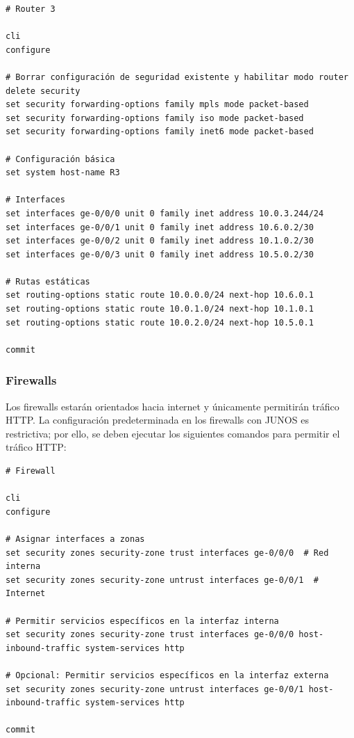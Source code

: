 \documentclass[%
    school=etsisi,%
    degree=61TI,%
]{upm-report}
\begin{document}
\begin{lstlisting}[breaklines]
# Router 3

cli
configure

# Borrar configuración de seguridad existente y habilitar modo router
delete security
set security forwarding-options family mpls mode packet-based
set security forwarding-options family iso mode packet-based
set security forwarding-options family inet6 mode packet-based

# Configuración básica
set system host-name R3

# Interfaces
set interfaces ge-0/0/0 unit 0 family inet address 10.0.3.244/24
set interfaces ge-0/0/1 unit 0 family inet address 10.6.0.2/30
set interfaces ge-0/0/2 unit 0 family inet address 10.1.0.2/30
set interfaces ge-0/0/3 unit 0 family inet address 10.5.0.2/30

# Rutas estáticas
set routing-options static route 10.0.0.0/24 next-hop 10.6.0.1
set routing-options static route 10.0.1.0/24 next-hop 10.1.0.1
set routing-options static route 10.0.2.0/24 next-hop 10.5.0.1

commit
\end{lstlisting}

\subsubsection{Firewalls}

Los firewalls estarán orientados hacia internet y únicamente permitirán tráfico HTTP. La configuración predeterminada en los firewalls con JUNOS es restrictiva; por ello, se deben ejecutar los siguientes comandos para permitir el tráfico HTTP:

\begin{lstlisting}[breaklines]
# Firewall

cli
configure

# Asignar interfaces a zonas
set security zones security-zone trust interfaces ge-0/0/0  # Red interna
set security zones security-zone untrust interfaces ge-0/0/1  # Internet

# Permitir servicios específicos en la interfaz interna
set security zones security-zone trust interfaces ge-0/0/0 host-inbound-traffic system-services http

# Opcional: Permitir servicios específicos en la interfaz externa
set security zones security-zone untrust interfaces ge-0/0/1 host-inbound-traffic system-services http

commit
\end{lstlisting}
\end{document}
